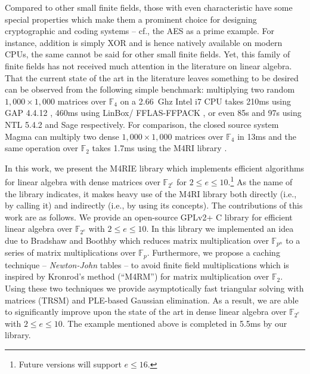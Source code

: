 \documentclass{sig-alternate}
\newcommand{\ring}[1]{\mathbb{#1}}
\newcommand{\F}{\ensuremath{\ring{F}}\xspace}
\newcommand{\FZE}{\ensuremath{\ring{F}_{2^e}}\xspace}
\newcommand{\erange}{\ensuremath{2 \leq e \leq 10}\xspace}
\newcommand{\mycomputer}{2.66~Ghz Intel i7\xspace}
\begin{document}
Compared to other small finite fields, those with even characteristic have some special properties which make them a prominent choice for designing cryptographic and coding systems -- cf., the AES \cite{Daemen2002} as a prime example. For instance, addition is simply XOR and is hence natively available on modern CPUs, the same cannot be said for other small finite fields. Yet, this family of finite fields has not received much attention in the literature on linear algebra. That the current state of the art in the literature leaves something to be desired can be observed from the following simple benchmark: multiplying two random $1,000 \times 1,000$ matrices over $\F_{4}$ on a \mycomputer CPU takes 210ms using GAP 4.4.12 \cite{GAP4}, 460ms using LinBox/ FFLAS-FFPACK \cite{FFPACK}, or even 85s and 97s using NTL 5.4.2 \cite{NTL} and Sage \cite{sage} respectively. For comparison, the closed source system Magma \cite{magma} can multiply two dense $1,000 \times 1,000$ matrices over $\F_{4}$ in 13ms and the same operation over $\F_2$ takes 1.7ms using the M4RI library \cite{m4ri-ple}.

In this work, we present the M4RIE library which implements efficient algorithms for linear algebra with dense matrices over \FZE for \erange.\footnote{Future versions will support $e \leq 16$.} As the name of the library indicates, it makes heavy use of the M4RI library \cite{m4ri} both directly (i.e., by calling it) and indirectly (i.e., by using its concepts). The contributions of this work are as follows.
We provide an open-source GPLv2+ C library for efficient linear algebra over \FZE with \erange. In this library we implemented an idea due to Bradshaw and Boothby \cite{BB09} which reduces matrix multiplication over $\F_{p^n}$ to a series of matrix multiplications over $\F_p$. Furthermore, we propose a caching technique -- \emph{Newton-John} tables -- to avoid finite field multiplications which is inspired by Kronrod's method (``M4RM'') \cite{ADKF70,matmulgf2} for matrix multiplication over $\F_2$. Using these two techniques we provide asymptotically fast triangular solving with matrices (TRSM) and PLE-based \cite{jeannerod-pernet-storjohann:cup2012} Gaussian elimination. As a result, we are able to significantly improve upon the state of the art in dense linear algebra over \FZE with \erange. The example mentioned above is completed in 5.5ms by our library.
\end{document}
